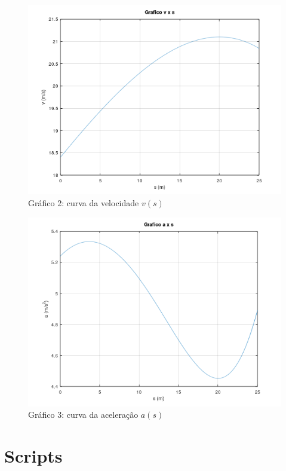 \documentclass[a4paper, 12pt]{article}
\begin{document}
	\begin{figure}[H]
		\centering
		\includegraphics[scale=1]{g1.png}
		\caption{Gráfico 2: curva da velocidade $v(s)$}
	\end{figure}
	
	\begin{figure}[H]
		\centering
		\includegraphics[scale=1]{g2.png}
		\caption{Gráfico 3: curva da aceleração $a(s)$}
	\end{figure}
	
	\newpage
	
	\section{Scripts}
	
\end{document}
